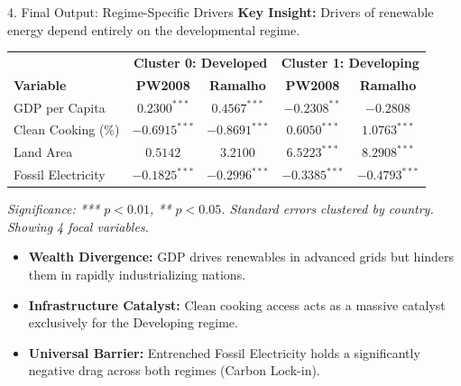 \documentclass[aspectratio=169]{beamer}
\begin{document}
\begin{frame}{4. Final Output: Regime-Specific Drivers}
  \vspace{-0.2cm} %
  {\small \textbf{Key Insight:} Drivers of renewable energy depend entirely on the developmental regime.}
  
  \begin{table}[]
      \centering
      \scriptsize %
      \begin{tabular}{l c c | c c}
      \toprule
      & \multicolumn{2}{c|}{\textbf{Cluster 0: Developed}} & \multicolumn{2}{c}{\textbf{Cluster 1: Developing}} \\
      \textbf{Variable} & \textbf{PW2008} & \textbf{Ramalho} & \textbf{PW2008} & \textbf{Ramalho} \\
      \midrule
      GDP per Capita & $0.2300^{***}$ & $0.4567^{***}$ & $-0.2308^{**}$ & $-0.2808$ \\
      Clean Cooking (\%) & $-0.6915^{***}$ & $-0.8691^{***}$ & $0.6050^{***}$ & $1.0763^{***}$ \\
      Land Area & $0.5142$ & $3.2100$ & $6.5223^{***}$ & $8.2908^{***}$ \\
      Fossil Electricity & $-0.1825^{***}$ & $-0.2996^{***}$ & $-0.3385^{***}$ & $-0.4793^{***}$ \\
      \bottomrule
      \end{tabular}
  \end{table}
  \vspace{-0.2cm}
  {\tiny\textit{Significance: *** $p<0.01$, ** $p<0.05$. Standard errors clustered by country. Showing 4 focal variables.}}\par
  
  \vspace{0.1cm}
  \begin{itemize}
      \footnotesize
      \item \textbf{Wealth Divergence:} GDP drives renewables in advanced grids but hinders them in rapidly industrializing nations.
      \item \textbf{Infrastructure Catalyst:} Clean cooking access acts as a massive catalyst exclusively for the Developing regime.
      \item \textbf{Universal Barrier:} Entrenched Fossil Electricity holds a significantly negative drag across both regimes (Carbon Lock-in).
  \end{itemize}
\end{frame}
\end{document}
